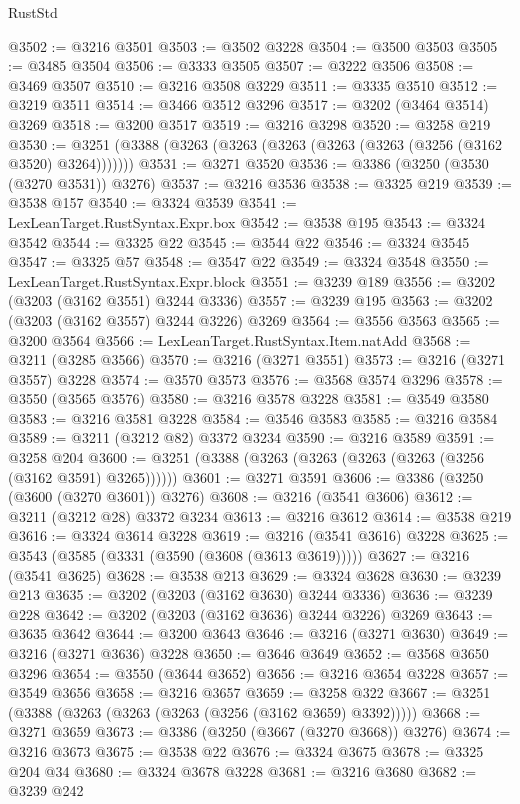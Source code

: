 \begin{lexlean}{RustStd}
\begin{coremodule}
@3502 := @3216 @3501
@3503 := @3502 @3228
@3504 := @3500 @3503
@3505 := @3485 @3504
@3506 := @3333 @3505
@3507 := @3222 @3506
@3508 := @3469 @3507
@3510 := @3216 @3508 @3229
@3511 := @3335 @3510
@3512 := @3219 @3511
@3514 := @3466 @3512 @3296
@3517 := @3202 (@3464 @3514) @3269
@3518 := @3200 @3517
@3519 := @3216 @3298
@3520 := @3258 @219
@3530 := @3251 (@3388 (@3263 (@3263 (@3263 (@3263 (@3263 (@3256 (@3162 @3520) @3264)))))))
@3531 := @3271 @3520
@3536 := @3386 (@3250 (@3530 (@3270 @3531)) @3276)
@3537 := @3216 @3536
@3538 := @3325 @219
@3539 := @3538 @157
@3540 := @3324 @3539
@3541 := LexLeanTarget.RustSyntax.Expr.box
@3542 := @3538 @195
@3543 := @3324 @3542
@3544 := @3325 @22
@3545 := @3544 @22
@3546 := @3324 @3545
@3547 := @3325 @57
@3548 := @3547 @22
@3549 := @3324 @3548
@3550 := LexLeanTarget.RustSyntax.Expr.block
@3551 := @3239 @189
@3556 := @3202 (@3203 (@3162 @3551) @3244 @3336)
@3557 := @3239 @195
@3563 := @3202 (@3203 (@3162 @3557) @3244 @3226) @3269
@3564 := @3556 @3563
@3565 := @3200 @3564
@3566 := LexLeanTarget.RustSyntax.Item.natAdd
@3568 := @3211 (@3285 @3566)
@3570 := @3216 (@3271 @3551)
@3573 := @3216 (@3271 @3557) @3228
@3574 := @3570 @3573
@3576 := @3568 @3574 @3296
@3578 := @3550 (@3565 @3576)
@3580 := @3216 @3578 @3228
@3581 := @3549 @3580
@3583 := @3216 @3581 @3228
@3584 := @3546 @3583
@3585 := @3216 @3584
@3589 := @3211 (@3212 @82) @3372 @3234
@3590 := @3216 @3589
@3591 := @3258 @204
@3600 := @3251 (@3388 (@3263 (@3263 (@3263 (@3263 (@3256 (@3162 @3591) @3265))))))
@3601 := @3271 @3591
@3606 := @3386 (@3250 (@3600 (@3270 @3601)) @3276)
@3608 := @3216 (@3541 @3606)
@3612 := @3211 (@3212 @28) @3372 @3234
@3613 := @3216 @3612
@3614 := @3538 @219
@3616 := @3324 @3614 @3228
@3619 := @3216 (@3541 @3616) @3228
@3625 := @3543 (@3585 (@3331 (@3590 (@3608 (@3613 @3619)))))
@3627 := @3216 (@3541 @3625)
@3628 := @3538 @213
@3629 := @3324 @3628
@3630 := @3239 @213
@3635 := @3202 (@3203 (@3162 @3630) @3244 @3336)
@3636 := @3239 @228
@3642 := @3202 (@3203 (@3162 @3636) @3244 @3226) @3269
@3643 := @3635 @3642
@3644 := @3200 @3643
@3646 := @3216 (@3271 @3630)
@3649 := @3216 (@3271 @3636) @3228
@3650 := @3646 @3649
@3652 := @3568 @3650 @3296
@3654 := @3550 (@3644 @3652)
@3656 := @3216 @3654 @3228
@3657 := @3549 @3656
@3658 := @3216 @3657
@3659 := @3258 @322
@3667 := @3251 (@3388 (@3263 (@3263 (@3263 (@3256 (@3162 @3659) @3392)))))
@3668 := @3271 @3659
@3673 := @3386 (@3250 (@3667 (@3270 @3668)) @3276)
@3674 := @3216 @3673
@3675 := @3538 @22
@3676 := @3324 @3675
@3678 := @3325 @204 @34
@3680 := @3324 @3678 @3228
@3681 := @3216 @3680
@3682 := @3239 @242

\end{coremodule}
\end{lexlean}
